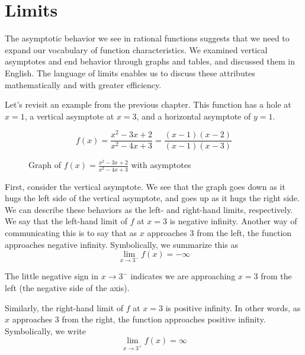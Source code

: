 \chapter{Limits}

The asymptotic behavior we see in rational functions suggests that we need to 
expand our vocabulary of function characteristics. We examined vertical 
asymptotes and end behavior through graphs and tables, and discussed them in 
English. The language of limits enables us to discuss these attributes 
mathematically and with greater efficiency. 

Let's revisit an example from the previous chapter. This function has a hole 
at $ x = 1 $, a vertical asymptote at $ x = 3 $, and a horizontal asymptote of 
$ y = 1 $.

$$ f(x) = \frac{x^2 - 3x + 2}{x^2 - 4x + 3} = \frac{(x-1)(x-2)}{(x-1)(x-3)} $$

\begin{figure}[htbp]
  \centering
  \caption{Graph of \( f(x) = \frac{x^2 - 3x + 2}{x^2 - 4x + 3} \) with 
  asymptotes}
\end{figure}

First, consider the vertical asymptote. We see that the graph goes down as it 
hugs the left side of the vertical asymptote, and goes up as it hugs the right 
side. We can describe these behaviors as the left- and right-hand limits, 
respectively. We say that the left-hand limit of $ f $ at $ x = 3 $ is 
negative infinity. Another way of communicating this is to say that as $ x $ 
approaches $ 3 $ from the left, the function approaches negative infinity. 
Symbolically, we summarize this as 
$$ \lim_{x \rightarrow 3^-} f(x) = -\infty $$

The little negative sign in $x \rightarrow 3^-$ indicates we are approaching 
$x = 3$ from the left (the negative side of the axis). 

Similarly, the right-hand limit of $ f $ at $ x = 3 $ is positive infinity. In 
other words, as $ x $ approaches $ 3 $ from the right, the function approaches 
positive infinity. Symbolically, we write 
$$ \lim_{x \rightarrow 3^+} f(x) = \infty $$

